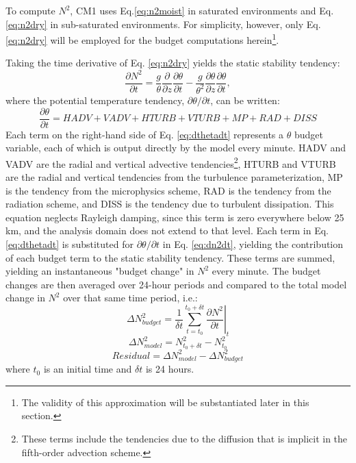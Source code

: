 \documentclass{ametsoc}
\begin{document}
To compute $N^2$, CM1 uses Eq.\ref{eq:n2moist} in saturated environments and Eq. \ref{eq:n2dry} in sub-saturated environments. For simplicity, however, only Eq. \ref{eq:n2dry} will be employed for the budget computations herein\footnote{The validity of this approximation will be substantiated later in this section.}.

Taking the time derivative of Eq. \ref{eq:n2dry} yields the static stability tendency:
   \begin{equation} \label{eq:dn2dt}
   \frac{\partial N^2}{\partial t} = \frac{g}{\theta}\frac{\partial}{\partial z}\frac{\partial \theta}{\partial t}-\frac{g}{\theta^2}\frac{\partial \theta}{\partial z}\frac{\partial \theta}{\partial t},
   \end{equation}
where the potential temperature tendency, $\partial \theta/\partial t$, can be written:
   \begin{equation} \label{eq:dthetadt}
   \frac{\partial \theta}{\partial t} = HADV+VADV+HTURB+VTURB+MP+RAD+DISS 
   \end{equation}
Each term on the right-hand side of Eq. \ref{eq:dthetadt} represents a $\theta$ budget variable, each of which is output directly by the model every minute.
HADV and VADV are the radial and vertical advective tendencies\footnote{These terms include the tendencies due to the diffusion that is implicit in the fifth-order advection scheme.}, HTURB and VTURB are the radial and vertical tendencies from the turbulence parameterization, MP is the tendency from the microphysics scheme, RAD is the tendency from the radiation scheme, and DISS is the tendency due to turbulent dissipation.
This equation neglects Rayleigh damping, since this term is zero everywhere below 25 km, and the analysis domain does not extend to that level.
Each term in Eq. \ref{eq:dthetadt} is substituted for ${\partial \theta}/{\partial t}$ in Eq. \ref{eq:dn2dt}, yielding the contribution of each budget term to the static stability tendency.
These terms are summed, yielding an instantaneous "budget change" in $N^2$ every minute.
The budget changes are then averaged over 24-hour periods and compared to the total model change in $N^2$ over that same time period, i.e.:
   \begin{equation} \label{eq:budgetchange}
   \Delta N^2_{budget} = \frac{1}{\delta t}\sum_{t=t_0}^{t_0+\delta t} \left.\frac{\partial N^2}{\partial t}\right\vert_t
   \end{equation}
   \begin{equation} \label{eq:modelchange}
   \Delta N^2_{model} = N^2_{t_0+\delta t}-N^2_{t_0}
   \end{equation}
   \begin{equation} \label{eq:residual}
   Residual = \Delta N^2_{model}-\Delta N^2_{budget}
   \end{equation}
where $t_0$ is an initial time and $\delta t$ is 24 hours.
\end{document}
